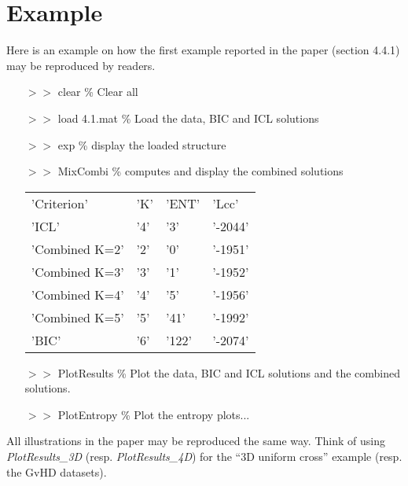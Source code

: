 \documentclass[12pt]{article}
\begin{document}
\section{Example}

Here is an example on how the first example reported in the paper (section 4.4.1) may be reproduced by readers. 

\begin{itemize}
\item[$>>$] clear \% Clear all
\item[$>>$] load 4.1.mat \% Load the data, BIC and ICL solutions
\item[$>>$] exp \% display the loaded structure
\item[$>>$] MixCombi \% computes and display the combined solutions

\begin{tabular}{llll}
    'Criterion'       &'K'    &'ENT'    &'Lcc'  \\
    'ICL'             &'4'    &'3'      &'-2044'\\
    'Combined K=2'    &'2'    &'0'      &'-1951'\\
    'Combined K=3'    &'3'    &'1'      &'-1952'\\
    'Combined K=4'    &'4'    &'5'      &'-1956'\\
    'Combined K=5'    &'5'    &'41'     &'-1992'\\
    'BIC'             &'6'    &'122'    &'-2074'\\
\end{tabular}
\item[$>>$] PlotResults \% Plot the data, BIC and ICL solutions and the combined solutions.
\item[$>>$] PlotEntropy \% Plot the entropy plots...
\end{itemize}

All illustrations in the paper may be reproduced the same way. Think of using {\it PlotResults\_3D} (resp. {\it PlotResults\_4D}) for the ``3D uniform cross'' example (resp. the GvHD datasets).
\end{document}
